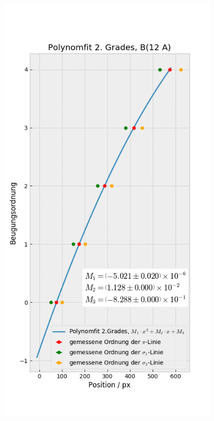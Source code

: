 \begin{myframe}{}
\begin{figure}
              \includegraphics[height=.85\paperheight]{img/sco_12A}

\end{figure}
\end{myframe}
